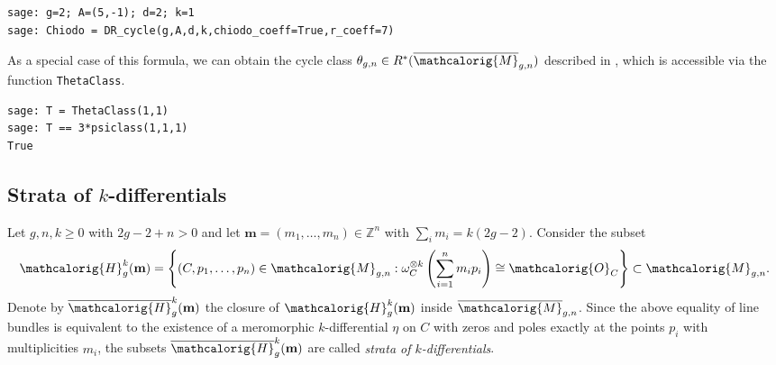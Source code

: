 \documentclass[11pt]{article}
\newcommand{\M}{\ensuremath{\overline{\mathcalorig{M}}}}
\begin{document}
\begin{lstlisting}
sage: g=2; A=(5,-1); d=2; k=1
sage: Chiodo = DR_cycle(g,A,d,k,chiodo_coeff=True,r_coeff=7)
\end{lstlisting}
As a special case of this formula, we can obtain the cycle class $\theta_{g,n} \in R^*(\M_{g,n})$ described in \cite{norbury}, which is accessible via the function \texttt{ThetaClass}.
\begin{lstlisting}
sage: T = ThetaClass(1,1)
sage: T == 3*psiclass(1,1,1)
True
\end{lstlisting}

\subsection{Strata of \texorpdfstring{$k$}{k}-differentials} \label{Sect:strata}
Let $g,n,k \geq 0$ with $2g-2+n>0$ and let $\textbf{m} = (m_1, \ldots, m_n) \in \mathbb{Z}^n$ with $\sum_i m_i = k(2g-2)$. Consider the subset
\[\mathcalorig{H}_g^k(\textbf{m}) = \left\{(C,p_1, \ldots, p_n) \in \mathcalorig{M}_{g,n} : \omega_C^{\otimes k}\left(\sum_{i=1}^n m_i p_i \right) \cong \mathcalorig{O}_C \right\} \subset \mathcalorig{M}_{g,n}.\]
Denote by $\overline{\mathcalorig{H}}_g^k(\textbf{m})$ the closure of $\mathcalorig{H}_g^k(\textbf{m})$ inside $\M_{g,n}$. Since the above equality of line bundles is equivalent to the existence of a meromorphic $k$-differential $\eta$ on $C$ with zeros and poles exactly at the points $p_i$ with multiplicities $m_i$, the subsets $\overline{\mathcalorig{H}}_g^k(\textbf{m})$ are called \emph{strata of $k$-differentials}.
\end{document}
